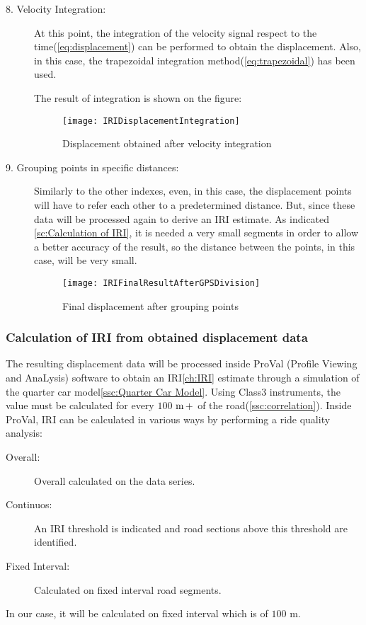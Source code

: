 \documentclass[tesi]{subfiles}
\begin{document}
\begin{description}
\item[8. Velocity Integration:]
At this point, the integration of the velocity signal respect to the time(\ref{eq:displacement}) can be performed to obtain the displacement. Also, in this case, the trapezoidal integration method(\ref{eq:trapezoidal}) has been used.

The result of integration is shown on the figure:

\begin{figure}[H]
\centering
\texttt{[image: IRIDisplacementIntegration]}
\caption{Displacement obtained after velocity integration}
\end{figure}
\clearpage
\item[9. Grouping points in specific distances:] Similarly to the other indexes, even, in this case, the displacement points will have to refer each other to a predetermined distance.
But, since these data will be processed again to derive an IRI estimate.
As indicated \ref{sc:Calculation of IRI}, it is needed a very small segments in order to allow a better accuracy of the result, so the distance between the points, in this case, will be very small.

\begin{figure}[H]
\centering
\texttt{[image: IRIFinalResultAfterGPSDivision]}
\caption{Final displacement after grouping points}
\end{figure}

\end{description}

\clearpage
\subsubsection{Calculation of IRI from obtained displacement data}
The resulting displacement data will be processed inside ProVal (Profile Viewing and AnaLysis) software to obtain an IRI\ref{ch:IRI} estimate through a simulation of the quarter car model\ref{ssc:Quarter Car Model}.
Using Class3 instruments, the value must be calculated for every $100$ $\si{\meter}\thinspace +$ of the road(\ref{ssc:correlation}).
Inside ProVal, IRI can be calculated in various ways by performing a ride quality analysis:
\begin{description}
\item[Overall:] Overall calculated on the data series.
\item[Continuos:] An IRI threshold is indicated and road sections above this threshold are identified.
\item[Fixed Interval:] Calculated on fixed interval road	 segments.
\end{description}
In our case, it will be calculated on fixed interval which is of $100$ $\si{\meter}$.
\end{document}

